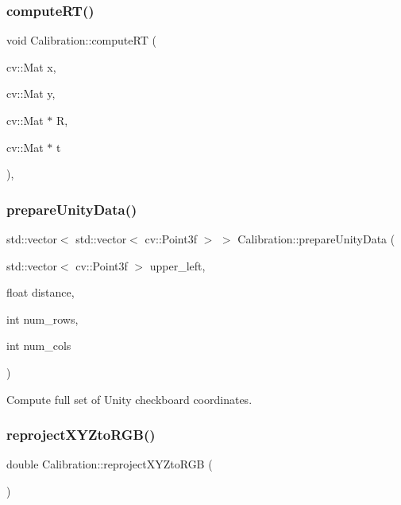 \subsubsection{\texorpdfstring{compute\+R\+T()}{computeRT()}}
{\footnotesize\ttfamily void Calibration\+::compute\+RT (\begin{DoxyParamCaption}\item[{cv\+::\+Mat}]{x,  }\item[{cv\+::\+Mat}]{y,  }\item[{cv\+::\+Mat $\ast$}]{R,  }\item[{cv\+::\+Mat $\ast$}]{t }\end{DoxyParamCaption})\hspace{0.3cm}{\ttfamily [static]}, {\ttfamily [private]}}

\hypertarget{class_calibration_af202af5f65e2f7242d29f09760f668d9}{}\label{class_calibration_af202af5f65e2f7242d29f09760f668d9} 
\subsubsection{\texorpdfstring{prepare\+Unity\+Data()}{prepareUnityData()}}
{\footnotesize\ttfamily std\+::vector$<$ std\+::vector$<$ cv\+::\+Point3f $>$ $>$ Calibration\+::prepare\+Unity\+Data (\begin{DoxyParamCaption}\item[{std\+::vector$<$ cv\+::\+Point3f $>$}]{upper\+\_\+left,  }\item[{float}]{distance,  }\item[{int}]{num\+\_\+rows,  }\item[{int}]{num\+\_\+cols }\end{DoxyParamCaption})\hspace{0.3cm}{\ttfamily [static]}}



Compute full set of Unity checkboard coordinates. 

\hypertarget{class_calibration_a05a3ca33bf7fb56ddf0c683be667660a}{}\label{class_calibration_a05a3ca33bf7fb56ddf0c683be667660a} 
\subsubsection{\texorpdfstring{reproject\+X\+Y\+Zto\+R\+G\+B()}{reprojectXYZtoRGB()}}
{\footnotesize\ttfamily double Calibration\+::reproject\+X\+Y\+Zto\+R\+GB (\begin{DoxyParamCaption}{ }\end{DoxyParamCaption})\hspace{0.3cm}{\ttfamily [static]}}



